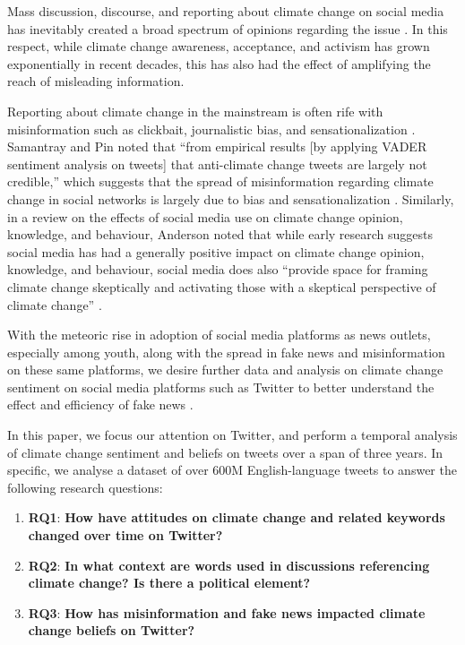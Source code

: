 \documentclass{paper}
\begin{document}
Mass discussion, discourse, and reporting about climate change on social media has inevitably created a broad spectrum of opinions regarding the issue \cite{PRC:HowPeopleWorldwideViewClimateChange}. In this respect, while climate change awareness, acceptance, and activism has grown exponentially in recent decades, this has also had the effect of amplifying the reach of misleading information.

Reporting about climate change in the mainstream is often rife with misinformation such as clickbait, journalistic bias, and sensationalization \cite{Cook2019}. Samantray and Pin noted that ``from empirical results [by applying VADER sentiment analysis on tweets] that anti-climate change tweets are largely not credible,'' which suggests that the spread of misinformation regarding climate change in social networks is largely due to bias and sensationalization \cite{Samantray2019}. Similarly, in a review on the effects of social media use on climate change opinion, knowledge, and behaviour, Anderson noted that while early research suggests social media has had a generally positive impact on climate change opinion, knowledge, and behaviour, social media does also ``provide space for framing climate change skeptically and activating those with a skeptical perspective of climate change'' \cite{Anderson2017}.

With the meteoric rise in adoption of social media platforms as news outlets, especially among youth, along with the spread in fake news and misinformation on these same platforms, we desire further data and analysis on climate change sentiment on social media platforms such as Twitter to better understand the effect and efficiency of fake news \cite{news_use_across_social_media_platforms_2016, Shu2017}.

In this paper, we focus our attention on Twitter, and perform a temporal analysis of climate change sentiment and beliefs on tweets over a span of three years. In specific, we analyse a dataset of over 600M English-language tweets to answer the following research questions:
\begin{enumerate}
    \item\label{rq1}\textbf{RQ1}: \textbf{How have attitudes on climate change and related keywords changed over time on Twitter?}
    \item\label{rq2}\textbf{RQ2}: \textbf{In what context are words used in discussions referencing climate change? Is there a political element?}
    \item\label{rq3}\textbf{RQ3}: \textbf{How has misinformation and fake news impacted climate change beliefs on Twitter?}
\end{enumerate}
\end{document}
